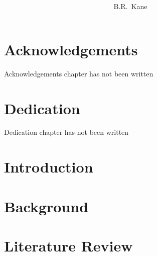 \documentclass[12pt,a4paper,openany,
               afrikaans,UKenglish,
               masters-t,goldenblock
              ]{stb-thesis}
\title{\bfseries
       \AorE{%
             Afrikaans title here\\[1ex]
             \normalfont\small\itshape
             (``Ergo: A Gesture-Based Computer Interaction Device'')
            }{%
             Ergo: A Gesture-Based Computer Interaction Device}}
\author{B.R.\ Kane}{Boyd Robert Kane}
\begin{document}
\frontmatter%
\TitlePage

\DeclarationPage

% 
% 
\chapter*{Acknowledgements}

Acknowledgements chapter has not been written %

% 
\chapter*{Dedication}
Dedication chapter has not been written %
% 
% 

\tableofcontents

\listoffigures
\listoftables
% 

\mainmatter%

\chapter{Introduction}\label{chap:introduction}


\chapter{Background}\label{chap:background}


\chapter{Literature Review}\label{chap:literature-review}

\end{document}
